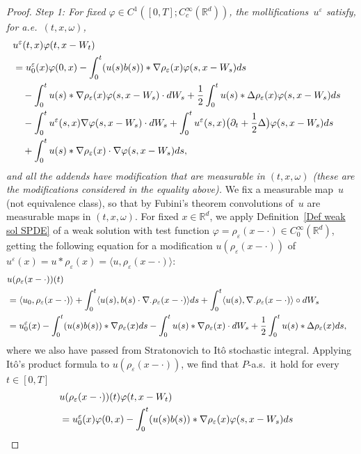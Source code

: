 \documentclass[a4paper,10pt]{article}
\newcommand\1{\mathbbm{1}}
\newcommand{\mr}{\mathbb{R}}
\newcommand{\lan}{\langle}
\newcommand{\ran}{\rangle}
\newcommand{\eps}{\varepsilon}
\numberwithin{equation}{section}
\begin{document}
\begin{proof}
\emph{Step 1: For fixed $\varphi \in C^1([0,T];C^\infty_c(\mr^d))$, the mollifications~$u^\eps$ satisfy, for a.e.~$(t,x,\omega)$, }
\begin{align}
\lefteqn{ u^\eps(t,x)\varphi(t,x-W_t)} \label{muvarphi}\\
 & = u_0^\eps(x)\varphi(0,x) -\int^t_0(u(s) b(s))*\nabla\rho_\eps(x)\varphi(s,x-W_s) ds \nonumber\\
 & \quad -\int^t_0 u(s)*\nabla\rho_\eps(x)\varphi(s,x-W_s)\cdot d W_s +\frac12 \int^t_0 u(s)*\Delta\rho_\eps(x)\varphi(s,x-W_s) ds \nonumber\\
 & \quad -\int^t_0 u^\eps(s,x)\nabla\varphi(s,x-W_s)\cdot d W_s +\int^t_0 u^\eps(s,x) \big(\partial_t+\frac12\Delta\big)\varphi(s,x-W_s) ds \nonumber\\
 & \quad +\int^t_0 u(s)*\nabla\rho_\eps(x)\cdot\nabla\varphi(s,x-W_s) ds,\nonumber
\end{align}
\emph{and all the addends have modification that are measurable in $(t,x,\omega)$ \textup{(}these are the modifications considered in the equality above\textup{)}.} We fix a measurable map~$u$ (not equivalence class), so that by Fubini's theorem convolutions of~$u$ are measurable maps in $(t,x,\omega)$. For fixed $x \in \mr^d$, we apply Definition~\ref{Def weak sol SPDE} of a weak solution with test function $\varphi=\rho_\eps(x-\cdot) \in C^\infty_0(\mr^d)$, getting the following equation for a modification $u(\rho_\eps(x-\cdot))$ of $u^\eps(x) = u*\rho_\eps (x) = \lan u, \rho_\eps(x-\cdot) \ran$:
\begin{align}
\label{eqn_u_eps_tested_1}
\lefteqn{u(\rho_\eps(x-\cdot))(t)}\\ 
 & = \langle u_{0},\rho_\eps(x-\cdot) \rangle +\int_{0}^{t} \lan u(s),b(s)  \cdot
\nabla_\cdot \rho_\eps(x-\cdot)\ran ds + \int_{0}^{t} \lan u(s),\nabla_\cdot \rho_\eps(x-\cdot) \ran \circ dW_{s} \nonumber \\
 & = u_0^\eps(x) -\int^t_0( u(s) b(s))*\nabla\rho_\eps(x) d s - \int^t_0  u(s)*\nabla\rho_\eps(x)\cdot d W_s +\frac12\int^t_0 u(s)*\Delta\rho_\eps(x) ds, \nonumber
\end{align}
where we also have passed from Stratonovich to It\^o stochastic integral. Applying It\^o's product formula to $u(\rho_\eps(x-\cdot))$, we find that $P$-a.s.~it hold for every~$t \in [0,T]$
\begin{align}
\label{eqn_u_eps_tested_2}
\lefteqn{u(\rho_\eps(x-\cdot))(t)\varphi(t,x-W_t)} \\
 & = u_0^\eps(x)\varphi(0,x) -\int^t_0(u(s) b(s))*\nabla\rho_\eps(x)\varphi(s,x-W_s) d s \nonumber \\

\end{align}
\end{proof}
\end{document}
